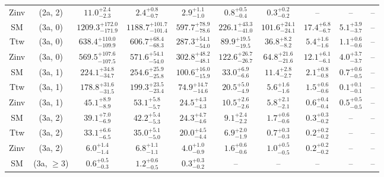 \begin{table}[h!]
{\begin{tabular}{cccccccccc}
	Zinv & (2a, 2) & $11.0^{+ 2.4 }_{- 2.3 }$ & $2.4^{+ 0.8 }_{- 0.7 }$ & $2.9^{+ 1.1 }_{- 1.0 }$ & $0.8^{+ 0.5 }_{- 0.4 }$ & $0.3^{+ 0.2 }_{- 0.2 }$ & -- & -- & -- \\[0.5ex] 
	SM & (3a, 0) & $1209.3^{+ 172.0 }_{- 171.9 }$ & $1188.7^{+ 101.7 }_{- 101.4 }$ & $597.7^{+ 78.9 }_{- 78.6 }$ & $226.1^{+ 43.3 }_{- 41.0 }$ & $101.6^{+ 24.1 }_{- 24.1 }$ & $17.4^{+ 6.8 }_{- 6.7 }$ & $5.1^{+ 3.9 }_{- 3.7 }$ & -- \\[0.5ex] 
	Ttw & (3a, 0) & $638.4^{+ 110.0 }_{- 109.9 }$ & $606.7^{+ 68.4 }_{- 68.3 }$ & $287.3^{+ 54.1 }_{- 54.0 }$ & $89.9^{+ 19.5 }_{- 19.5 }$ & $36.8^{+ 8.2 }_{- 8.2 }$ & $5.4^{+ 1.6 }_{- 1.6 }$ & $1.1^{+ 0.6 }_{- 0.6 }$ & -- \\[0.5ex] 
	Zinv & (3a, 0) & $569.5^{+ 107.6 }_{- 107.5 }$ & $571.6^{+ 54.1 }_{- 54.0 }$ & $302.8^{+ 48.2 }_{- 48.1 }$ & $122.6^{+ 26.7 }_{- 26.7 }$ & $64.8^{+ 21.6 }_{- 21.6 }$ & $12.1^{+ 6.1 }_{- 6.1 }$ & $4.0^{+ 3.7 }_{- 3.7 }$ & -- \\[0.5ex] 
	SM & (3a, 1) & $224.1^{+ 34.8 }_{- 34.7 }$ & $254.6^{+ 25.9 }_{- 25.8 }$ & $100.6^{+ 16.0 }_{- 15.9 }$ & $33.0^{+ 6.9 }_{- 6.6 }$ & $11.4^{+ 2.8 }_{- 2.7 }$ & $2.1^{+ 0.8 }_{- 0.8 }$ & $0.7^{+ 0.6 }_{- 0.5 }$ & -- \\[0.5ex] 
	Ttw & (3a, 1) & $178.8^{+ 31.6 }_{- 31.5 }$ & $199.3^{+ 23.5 }_{- 23.4 }$ & $74.9^{+ 14.7 }_{- 14.6 }$ & $20.5^{+ 5.0 }_{- 4.9 }$ & $5.6^{+ 1.6 }_{- 1.6 }$ & $1.5^{+ 0.6 }_{- 0.6 }$ & $0.1^{+ 0.1 }_{- 0.1 }$ & -- \\[0.5ex] 
	Zinv & (3a, 1) & $45.1^{+ 8.9 }_{- 8.9 }$ & $53.1^{+ 5.8 }_{- 5.7 }$ & $24.5^{+ 4.3 }_{- 4.3 }$ & $10.5^{+ 2.6 }_{- 2.6 }$ & $5.8^{+ 2.1 }_{- 2.1 }$ & $0.6^{+ 0.4 }_{- 0.4 }$ & $0.5^{+ 0.5 }_{- 0.5 }$ & -- \\[0.5ex] 
	SM & (3a, 2) & $39.1^{+ 7.0 }_{- 6.9 }$ & $42.2^{+ 5.4 }_{- 5.3 }$ & $24.3^{+ 4.7 }_{- 4.6 }$ & $9.1^{+ 2.4 }_{- 2.2 }$ & $1.7^{+ 0.6 }_{- 0.6 }$ & $0.3^{+ 0.3 }_{- 0.2 }$ & -- & -- \\[0.5ex] 
	Ttw & (3a, 2) & $33.1^{+ 6.6 }_{- 6.5 }$ & $35.0^{+ 5.1 }_{- 5.0 }$ & $20.0^{+ 4.5 }_{- 4.4 }$ & $6.9^{+ 2.0 }_{- 1.9 }$ & $0.7^{+ 0.3 }_{- 0.3 }$ & $0.2^{+ 0.2 }_{- 0.2 }$ & -- & -- \\[0.5ex] 
	Zinv & (3a, 2) & $6.0^{+ 1.4 }_{- 1.4 }$ & $6.8^{+ 1.1 }_{- 1.1 }$ & $4.0^{+ 1.0 }_{- 0.9 }$ & $1.6^{+ 0.6 }_{- 0.6 }$ & $1.0^{+ 0.5 }_{- 0.5 }$ & $0.2^{+ 0.2 }_{- 0.2 }$ & -- & -- \\[0.5ex] 
	SM & (3a, $\ge3$) & $0.6^{+ 0.5 }_{- 0.3 }$ & $1.2^{+ 0.6 }_{- 0.5 }$ & $0.3^{+ 0.3 }_{- 0.2 }$ & -- & -- & -- & -- & -- \\[0.5ex] 

\end{tabular}}
\end{table}
